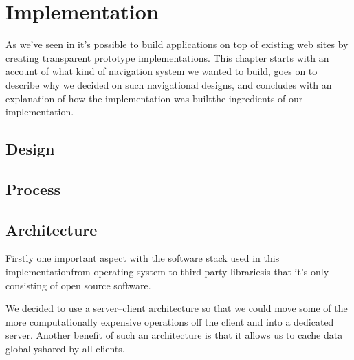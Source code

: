 \chapter{Implementation}
\label{chapter:implementation}


As we've seen in 
it's possible to build applications on top of existing web sites by creating
transparent prototype implementations. This chapter starts with an account of
what kind of navigation system we wanted to build, goes on to describe why we
decided on such navigational designs, and concludes with an explanation of how
the implementation was built\dash{}the ingredients of our implementation.

\section{Design}

\section{Process}

\section{Architecture}

Firstly one important aspect with the software stack used in this
implementation\dash{}from operating system to third party libraries\dash{}is
that it's only consisting of open source software.

We decided to use a server--client architecture so that we could move some of
the more computationally expensive operations off the client and into a
dedicated server. Another benefit of such an architecture is that it allows us
to cache data globally\dash{}shared by all clients.

